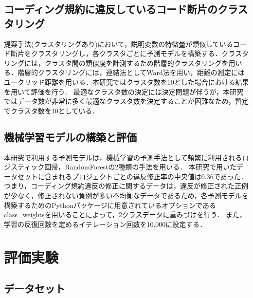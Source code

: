 \documentclass[submit,noauthor,ses,dvipdfmx]{ipsj}
\begin{document}
\subsection{コーディング規約に違反しているコード断片のクラスタリング}


提案手法(クラスタリングあり)において，説明変数の特徴量が類似しているコード断片をクラスタリングし，各クラスタごとに予測モデルを構築する．クラスタリングには，クラスタ間の類似度を計測するため階層的クラスタリングを用いる．階層的クラスタリングには，連結法としてWard法を用い，距離の測定にはユークリッド距離を用いる\cite{ward}．本研究ではクラスタ数を10とした場合における結果を用いて評価を行う．
最適なクラスタ数の決定には決定問題が伴うが，本研究ではデータ数が非常に多く最適なクラスタ数を決定することが困難なため，暫定でクラスタ数を10としている．


\subsection{機械学習モデルの構築と評価}

本研究で利用する予測モデルは，機械学習の予測手法として頻繁に利用されるロジスティック回帰，RandomForestの2種類の手法を用いる．
本研究で用いたデータセットに含まれるプロジェクトごとの違反修正率の中央値は0.36であった．つまり，コーディング規約違反の修正に関するデータは，違反が修正された正例が少なく，修正されない負例が多い不均衡なデータであるため，各予測モデルを構築するためのPythonパッケージに用意されているオプションであるclass\_weightsを用いることによって，2クラスデータに重みづけを行う．
また，学習の反復回数を定めるイテレーション回数を10,000に設定する．

\section{評価実験}\label{chap:result}

\subsection{データセット}
\end{document}
